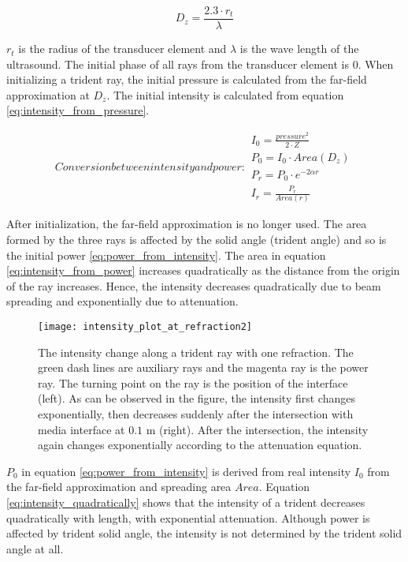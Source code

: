 \begin{equation} \label{eq:distancz}
    D_z=\frac{2.3 \cdot r_t}{\lambda}
\end{equation}

$r_t$ is the radius of the transducer element and $\lambda$ is the wave length of the ultrasound. The initial phase of all rays from the transducer element is 0. When initializing a trident ray, the initial pressure is calculated from the far-field approximation at $D_z$. The initial intensity is calculated from equation \ref{eq:intensity_from_pressure}.

\begin{subequations}
    Conversion between intensity and power:
    \begin{align} 
        I_0 = \frac{pressure^2}{2 \cdot Z} \label{eq:intensity_from_pressure}\\
        P_0 = I_0 \cdot Area(D_z) \label{eq:power_from_intensity}\\
        P_{r} = P_0 \cdot e^{-2 \alpha r} \label{eq:power_decay}\\
        I_{r} = \frac{P_r}{Area(r)} \label{eq:intensity_from_power}
    \end{align}
\end{subequations}

After initialization, the far-field approximation is no longer used. The area formed by the three rays is affected by the solid angle (trident angle) and so is the initial power \ref{eq:power_from_intensity}. The area in equation \ref{eq:intensity_from_power} increases quadratically as the distance from the origin of the ray increases. Hence, the intensity decreases quadratically due to beam spreading and exponentially due to attenuation. 

\begin{figure}[h]
    \centering
    \texttt{[image: intensity\_plot\_at\_refraction2]}
    \caption{The intensity change along a trident ray  with one refraction. The green dash lines are auxiliary rays and the magenta ray is the power ray. The turning point on the ray is the position of the interface (left). As can be observed in the figure, the intensity first changes exponentially, then decreases suddenly after the intersection with media interface at $0.1$ m (right). After the intersection, the intensity again changes exponentially according to the attenuation equation.}
    \label{fig:intensity_plot_at_refraction2}
\end{figure}

$P_0$ in equation \ref{eq:power_from_intensity} is derived from real intensity $I_0$ from the far-field approximation and spreading area $Area$. Equation \ref{eq:intensity_quadratically} shows that the intensity of a trident decreases quadratically with length, with exponential attenuation. Although power is affected by trident solid angle, the intensity is not determined by the trident solid angle at all.

